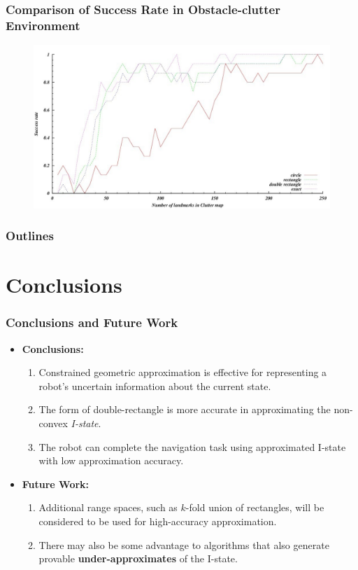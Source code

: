 \documentclass[compress]{beamer}
\begin{document}
\begin{frame} \frametitle{Comparison of Success Rate in Obstacle-clutter Environment}
\begin{figure}
    \includegraphics[scale=0.44]{rate-clutter.jpg}
\end{figure}
\end{frame}


\begin{frame}
  \frametitle{Outlines}
  \tableofcontents[]
  \transboxout
\end{frame}
\section[Conclusions]{Conclusions}
\begin{frame} \frametitle{Conclusions and Future Work}
\begin{itemize}
\item \textbf{\textcolor[rgb]{0.50,0.00,0.00}{Conclusions:}}
    \begin{enumerate}
    \item Constrained geometric approximation is effective for representing a robot's
    uncertain information about the current state.
    \item The form of double-rectangle is more accurate in approximating the non-convex
    \emph{I-state}.
    \item The robot can complete the navigation task using approximated I-state with
    low approximation accuracy.
    \end{enumerate}
\item \textbf{\textcolor[rgb]{0.50,0.00,0.00}{Future Work:}}
    \begin{enumerate}
    \item Additional range spaces, such as $k$-fold union of rectangles,
     will be considered to be used for high-accuracy approximation.

    \item There may also be some advantage to
    algorithms that also generate provable \textbf{under-approximates} of the I-state.
    \end{enumerate}
\end{itemize}
\transboxout
\end{frame}
\end{document}
